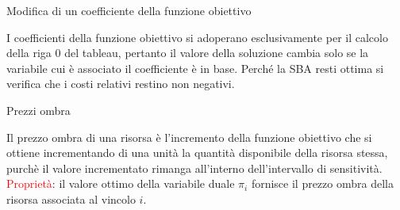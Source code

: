 \documentclass[answers, a4paper, 11pt]{exam}
\begin{document}
\begin{questions}
\begin{solution}
\end{solution}
\question Modifica di un coefficiente della funzione obiettivo
\begin{solution}
I coefficienti della funzione obiettivo si adoperano esclusivamente per il calcolo della riga 0 del tableau, pertanto il valore della soluzione cambia solo se la variabile cui è associato il coefficiente è in base. Perché la SBA resti ottima si verifica che i costi relativi restino non negativi.
\end{solution}
\question Prezzi ombra
\begin{solution}
Il prezzo ombra di una risorsa è l'incremento della funzione obiettivo che si ottiene incrementando di una unità la quantità disponibile della risorsa stessa, purchè il valore incrementato rimanga all'interno dell'intervallo di sensitività.\\
\textcolor{red}{Proprietà}: il valore ottimo della variabile duale $\pi_{i}$ fornisce il prezzo ombra della risorsa associata al vincolo $i$.
\end{solution}
\end{questions}
\end{document}
